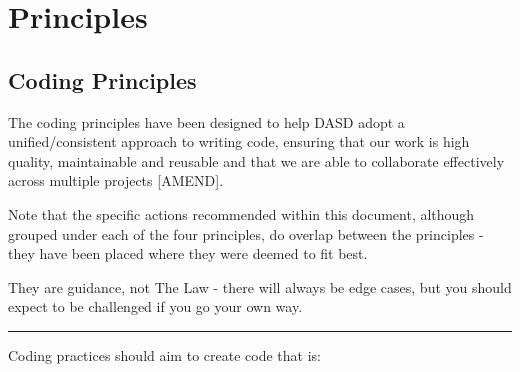 \documentclass[]{book}
\begin{document}
\hypertarget{part-principles}{%
\part{Principles}\label{part-principles}}

\hypertarget{principles}{%
\chapter*{Coding Principles}\label{principles}}

The coding principles have been designed to help DASD adopt a unified/consistent approach to writing code, ensuring that our work is high quality, maintainable and reusable and that we are able to collaborate effectively across multiple projects {[}AMEND{]}.

Note that the specific actions recommended within this document, although grouped under each of the four principles, do overlap between the principles - they have been placed where they were deemed to fit best.

They are guidance, not The Law - there will always be edge cases, but you should expect to be challenged if you go your own way.

\begin{center}\rule{0.5\linewidth}{\linethickness}\end{center}

Coding practices should aim to create code that is:
\end{document}
